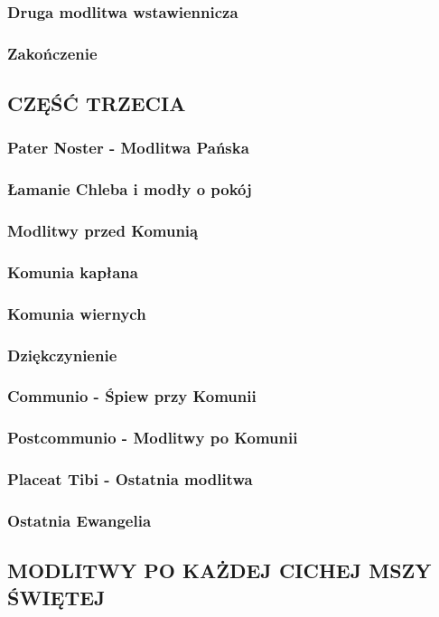 \documentclass[10pt,titlepage]{article}
\begin{document}
	\subsubsection{Druga modlitwa wstawiennicza}
	\subsubsection{Zakończenie}
	
	\subsection{CZĘŚĆ TRZECIA}
	
	\subsubsection{Pater Noster - Modlitwa Pańska}
	\subsubsection{Łamanie Chleba i modły o pokój}
	\subsubsection{Modlitwy przed Komunią}
	\subsubsection{Komunia kapłana}
	\subsubsection{Komunia wiernych}
	\subsubsection{Dziękczynienie}
	\subsubsection{Communio - Śpiew przy Komunii}
	\subsubsection{Postcommunio - Modlitwy po Komunii}
	\subsubsection{Placeat Tibi - Ostatnia modlitwa}
	\subsubsection{Ostatnia Ewangelia}
	
	\subsection{MODLITWY PO KAŻDEJ CICHEJ MSZY ŚWIĘTEJ}
	
\end{document}
